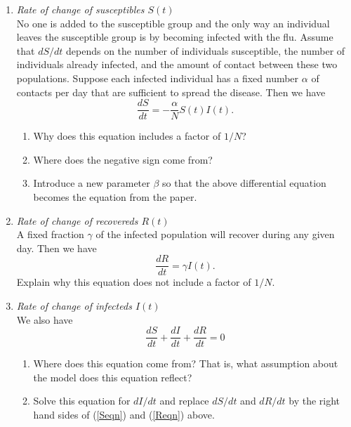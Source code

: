 \documentclass[12pt]{article}
\begin{document}
 \begin{enumerate}[resume]
\item \textit{Rate of change of susceptibles $S(t)$}\\
\noindent No one is added to the susceptible group and the only way an individual leaves the susceptible group is by becoming infected with the flu.  Assume that $d S/d t$ depends on the number of individuals susceptible, the number of individuals already infected, and the amount of contact between these two populations.  Suppose each infected individual has a fixed number $\alpha$ of contacts per day that are sufficient to spread the disease.  Then we have
\begin{equation}\label{Seqn}
\frac{d S}{d t} = -\frac{\alpha}{N} S(t) I(t).
\end{equation}
\begin{enumerate}
\item Why does this equation includes a factor of $1/N$?
\vspace{1.2in}
\item Where does the negative sign come from?
\vspace{1.2in}
\item Introduce a new parameter $\beta$ so that the above differential equation becomes the equation from the paper.
\vspace{1in}
\end{enumerate}  

\item \textit{Rate of change of recovereds $R(t)$}\\
\noindent  A fixed fraction  $\gamma$ of the infected population will recover during any given day.  Then we have
\begin{equation}\label{Reqn}
\frac{d R}{d t} = \gamma I(t).
\end{equation}
Explain why this equation does not include a factor of $1/N$.
\newpage 
\item \textit{Rate of change of infecteds $I(t)$}\\
\smallskip
\noindent We also have
\[
\frac{d S}{d t} + \frac{d I }{d t} + \frac{d R}{d t} = 0
\]
\begin{enumerate}
\item Where does this equation come from?  That is, what assumption about the model does this equation reflect?  
\vspace{2in}
\item Solve this equation for $dI/dt$ and replace $dS/dt$ and $dR/dt$ by the right hand sides of (\ref{Seqn}) and (\ref{Reqn}) above.  
\vspace{2in}
\end{enumerate}


\end{enumerate}
\end{document}
